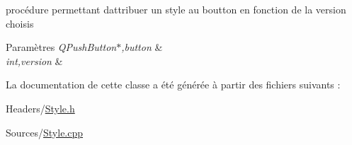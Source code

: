 procédure permettant d\textquotesingle{}attribuer un style au boutton en fonction de la version choisis 


\begin{DoxyParams}{Paramètres}
{\em Q\+Push\+Button$\ast$,button} & \\
\hline
{\em int,version} & \\
\hline
\end{DoxyParams}


La documentation de cette classe a été générée à partir des fichiers suivants \+:\begin{DoxyCompactItemize}
\item 
Headers/\hyperlink{_style_8h}{Style.\+h}\item 
Sources/\hyperlink{_style_8cpp}{Style.\+cpp}\end{DoxyCompactItemize}
